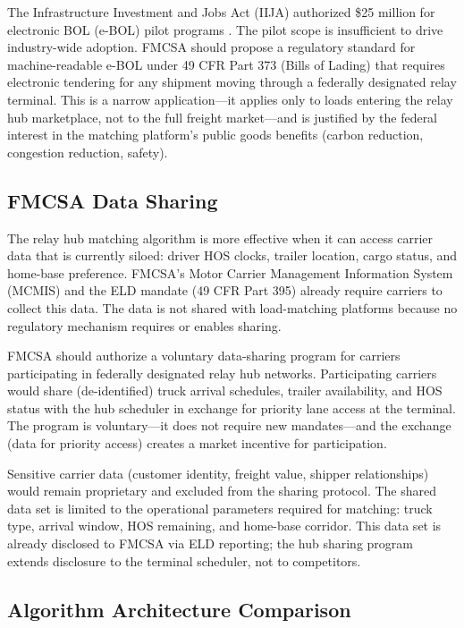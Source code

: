 The Infrastructure Investment and Jobs Act (IIJA) authorized \$25 million for electronic BOL (e-BOL) pilot programs \citep{IIJA2021}. The pilot scope is insufficient to drive industry-wide adoption. FMCSA should propose a regulatory standard for machine-readable e-BOL under 49 CFR Part 373 (Bills of Lading) that requires electronic tendering for any shipment moving through a federally designated relay terminal. This is a narrow application---it applies only to loads entering the relay hub marketplace, not to the full freight market---and is justified by the federal interest in the matching platform's public goods benefits (carbon reduction, congestion reduction, safety).

\subsection{FMCSA Data Sharing}

The relay hub matching algorithm is more effective when it can access carrier data that is currently siloed: driver HOS clocks, trailer location, cargo status, and home-base preference. FMCSA's Motor Carrier Management Information System (MCMIS) and the ELD mandate (49 CFR Part 395) already require carriers to collect this data. The data is not shared with load-matching platforms because no regulatory mechanism requires or enables sharing.

FMCSA should authorize a voluntary data-sharing program for carriers participating in federally designated relay hub networks. Participating carriers would share (de-identified) truck arrival schedules, trailer availability, and HOS status with the hub scheduler in exchange for priority lane access at the terminal. The program is voluntary---it does not require new mandates---and the exchange (data for priority access) creates a market incentive for participation.

Sensitive carrier data (customer identity, freight value, shipper relationships) would remain proprietary and excluded from the sharing protocol. The shared data set is limited to the operational parameters required for matching: truck type, arrival window, HOS remaining, and home-base corridor. This data set is already disclosed to FMCSA via ELD reporting; the hub sharing program extends disclosure to the terminal scheduler, not to competitors.

\subsection{Algorithm Architecture Comparison}

